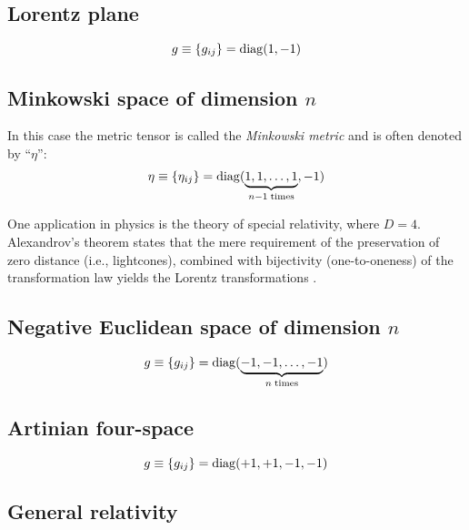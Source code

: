 \subsection*{Lorentz plane}


\begin{equation}
g\equiv \{g_{ij}\}={\rm diag} (1,-1)
\end{equation}

\subsection*{Minkowski space of dimension $n$}

In this case the metric tensor is called the
{\em Minkowski metric}
and is often denoted by  ``$\eta$'':
\begin{equation}
\eta \equiv \{\eta_{ij}\}={\rm diag} (\underbrace{1,1,\ldots ,1}_{n-1\; {\rm times}},-1)
\label{2012-m-ch-tensor-minspn}
\end{equation}


One application in physics is the theory of special relativity,
where $D=4$.
Alexandrov's theorem states that the mere requirement of the preservation of
zero distance (i.e., lightcones), combined with bijectivity (one-to-oneness) of the transformation law
yields the Lorentz transformations
\cite{alex1,alex2,alex3,alex-col,borchers-heger,benz,lester,svozil-2001-convention}.



\subsection*{Negative Euclidean space of dimension $n$}

\begin{equation}
g\equiv \{g_{ij}\}={\rm diag} (\underbrace{-1,-1,\ldots ,-1}_{n\; {\rm times}})
\end{equation}

\subsection*{Artinian four-space}

\begin{equation}
g\equiv \{g_{ij}\}={\rm diag} (+1,+1,-1 ,-1)
\end{equation}



\subsection*{General relativity}


